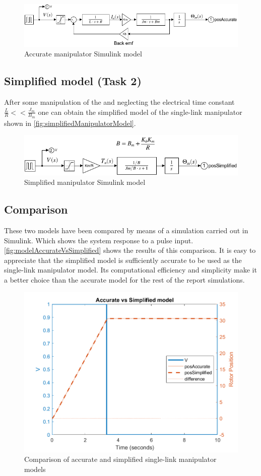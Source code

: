 \begin{figure}
    \includegraphics[width=\textwidth]{accurateManipulatorModel.slx.png}
    \caption{Accurate manipulator Simulink model}
    \label{fig:accurateManipulatorModel}
\end{figure}

\subsection{Simplified model (Task 2)}
\label{subsec:simplified-model}
After some manipulation of the  and neglecting
the electrical time constant $\frac{L}{R}<<\frac{J_m}{B_m}$ \cite{SingleLink}
one can obtain the simplified model of the single-link manipulator shown in
\autoref{fig:simplifiedManipulatorModel}.

\begin{figure}
    \includegraphics[width=\textwidth]{simplifiedManipulatorModel.slx.png}
    \caption{Simplified manipulator Simulink model}
    \label{fig:simplifiedManipulatorModel}
\end{figure}

\subsection{Comparison}
These two models have been compared by means of a simulation carried out in
Simulink. Which shows the system response to a pulse input.
\autoref{fig:modelAccurateVsSimplified} shows the results of this comparison.
It is easy to appreciate that the simplified model is sufficiently accurate to
be used as the single-link manipulator model. Its computational efficiency and
simplicity make it a better choice than the accurate model for the rest of the
report simulations.

\begin{figure}
    \centering
    \includegraphics[width=.6\textwidth]{modelAccurateVsSimplified.png}
    \caption{Comparison of accurate and simplified single-link manipulator models}
    \label{fig:modelAccurateVsSimplified}
\end{figure}